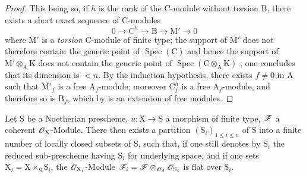 \begin{proof}
This being so, if $h$ is the rank of the $\mathrm{C}$-module without torsion $\mathrm{B}$, there exists a short exact sequence of $\mathrm{C}$-modules
\[
0\to\mathrm{C}^h\to\mathrm{B}\to\mathrm{M}'\to 0
\]
where $\mathrm{M}'$ is a \emph{torsion} $\mathrm{C}$-module of finite type; the support of $\mathrm{M}'$ does not therefore contain the generic point of $\operatorname{Spec}(\mathrm{C})$  and hence the support of $\mathrm{M}'\otimes_\mathrm{A}\mathrm{K}$ does not contain the generic point of $\operatorname{Spec}(\mathrm{C}\otimes_\mathrm{A}\mathrm{K})$ ; one concludes  that its dimension is $<n$. By the induction hypothesis, there exists $f\neq 0$ in $\mathrm{A}$ such that $\mathrm{M}'_f$ is a free $\mathrm{A}_f$-module; moreover $\mathrm{C}^h_f$ is a free $\mathrm{A}_f$-module, and therefore so is $\mathrm{B}_f$, which by  is an extension of free modules.
\end{proof}

\begin{corollary}[6.9.3]
\label{IV.6.9.3}
Let $\mathrm{S}$ be a Noetherian prescheme, $u:\mathrm{X}\to\mathrm{S}$ a morphism of finite type, $\mathscr{F}$ a coherent $\mathscr{O}_\mathrm{X}$-Module. There then exists a partition $(\mathrm{S}_i)_{1\leqslant i\leqslant n}$ of $\mathrm{S}$ into a finite number of locally closed subsets of $\mathrm{S}$, such that, if one still denotes by $\mathrm{S}_i$ the reduced sub-prescheme having $\mathrm{S}_i$ for underlying space, and if one sets $\mathrm{X}_i=\mathrm{X}\times_\mathrm{S}\mathrm{S}_i$, the $\mathscr{O}_{\mathrm{X}_i}$-Module $\mathscr{F}_i=\mathscr{F}\otimes_{\mathscr{O}_\mathrm{S}}\mathscr{O}_{\mathrm{S}_i}$ is flat over $\mathrm{S}_i$.
\end{corollary}

